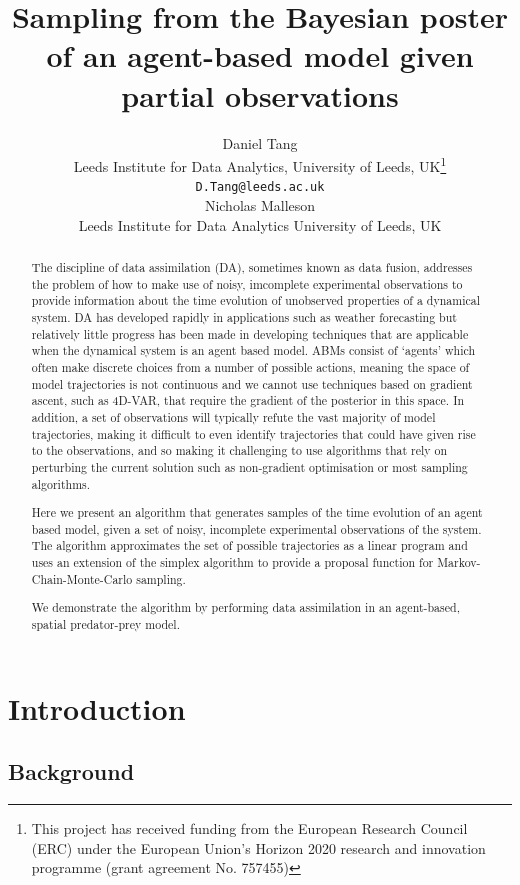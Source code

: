 \documentclass{article}
\title{Sampling from the Bayesian poster of an agent-based model given partial observations}
\author{
  Daniel Tang\\
    Leeds Institute for Data Analytics, University of Leeds, UK\thanks{This project has received funding from the European Research Council (ERC) under the European Union’s Horizon 2020 research and innovation programme (grant agreement No. 757455)}\\
  \texttt{D.Tang@leeds.ac.uk}\\
  \AND
  Nicholas Malleson\\
  Leeds Institute for Data Analytics University of Leeds, UK\\  
}
\begin{document}
\maketitle

\begin{abstract}
The discipline of data assimilation (DA), sometimes known as data fusion, addresses the problem of how to make use of noisy, imcomplete experimental observations to provide information about the time evolution of unobserved properties of a dynamical system. DA has developed rapidly in applications such as weather forecasting but relatively little progress has been made in developing techniques that are applicable when the dynamical system is an agent based model. ABMs consist of `agents' which often make discrete choices from a number of possible actions, meaning the space of model trajectories is not continuous and we cannot use techniques based on gradient ascent, such as 4D-VAR, that require the gradient of the posterior in this space. In addition, a set of observations will typically refute the vast majority of model trajectories, making it difficult to even identify trajectories that could have given rise to the observations, and so making it challenging to use algorithms that rely on perturbing the current solution such as non-gradient optimisation or most sampling algorithms.

Here we present an algorithm that generates samples of the time evolution of an agent based model, given a set of noisy, incomplete experimental observations of the system. The algorithm approximates the set of possible trajectories as a linear program and uses an extension of the simplex algorithm to provide a proposal function for Markov-Chain-Monte-Carlo sampling.

We demonstrate the algorithm by performing data assimilation in an agent-based, spatial predator-prey model.
\end{abstract}


\section{Introduction}

\subsection{Background}\label{sec:background}
\end{document}
